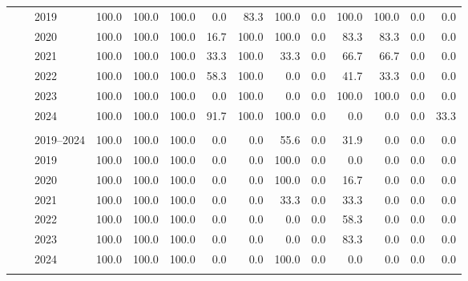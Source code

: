 \begin{table}[htbp]
\begin{tabular}{lllrrrrrrrrrrr}
 & & 2019 & 100.0 & 100.0 & 100.0 & 0.0 & 83.3 & 100.0 & 0.0 & 100.0 & 100.0 & 0.0 & 0.0 \\
 & & 2020 & 100.0 & 100.0 & 100.0 & 16.7 & 100.0 & 100.0 & 0.0 & 83.3 & 83.3 & 0.0 & 0.0 \\
 & & 2021 & 100.0 & 100.0 & 100.0 & 33.3 & 100.0 & 33.3 & 0.0 & 66.7 & 66.7 & 0.0 & 0.0 \\
 & & 2022 & 100.0 & 100.0 & 100.0 & 58.3 & 100.0 & 0.0 & 0.0 & 41.7 & 33.3 & 0.0 & 0.0 \\
 & & 2023 & 100.0 & 100.0 & 100.0 & 0.0 & 100.0 & 0.0 & 0.0 & 100.0 & 100.0 & 0.0 & 0.0 \\
 & & 2024 & 100.0 & 100.0 & 100.0 & 91.7 & 100.0 & 100.0 & 0.0 & 0.0 & 0.0 & 0.0 & 33.3 \\
\addlinespace[2pt]
\multicolumn{14}{l}{\textit{Cali --- Female child}} \\
 & & 2019–2024 & 100.0 & 100.0 & 100.0 & 0.0 & 0.0 & 55.6 & 0.0 & 31.9 & 0.0 & 0.0 & 0.0 \\
 & & 2019 & 100.0 & 100.0 & 100.0 & 0.0 & 0.0 & 100.0 & 0.0 & 0.0 & 0.0 & 0.0 & 0.0 \\
 & & 2020 & 100.0 & 100.0 & 100.0 & 0.0 & 0.0 & 100.0 & 0.0 & 16.7 & 0.0 & 0.0 & 0.0 \\
 & & 2021 & 100.0 & 100.0 & 100.0 & 0.0 & 0.0 & 33.3 & 0.0 & 33.3 & 0.0 & 0.0 & 0.0 \\
 & & 2022 & 100.0 & 100.0 & 100.0 & 0.0 & 0.0 & 0.0 & 0.0 & 58.3 & 0.0 & 0.0 & 0.0 \\
 & & 2023 & 100.0 & 100.0 & 100.0 & 0.0 & 0.0 & 0.0 & 0.0 & 83.3 & 0.0 & 0.0 & 0.0 \\
 & & 2024 & 100.0 & 100.0 & 100.0 & 0.0 & 0.0 & 100.0 & 0.0 & 0.0 & 0.0 & 0.0 & 0.0 \\
\addlinespace[2pt]
\bottomrule
\end{tabular}
\vspace{0.5em}
\endgroup
\end{table}
